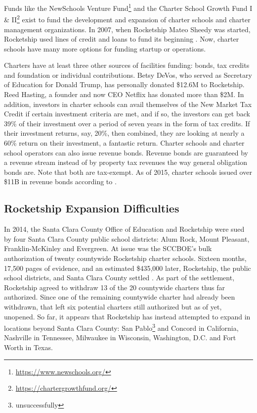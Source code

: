 Funds like the NewSchools Venture Fund\footnote{\url{https://www.newschools.org/}} and the Charter School Growth Fund I \& II\footnote{\url{https://chartergrowthfund.org/}} exist to fund the development and expansion of charter schools and charter management organizations. In 2007, when Rocketship Mateo Sheedy was started, Rocketship used lines of credit and loans to fund its beginning \parencite[260]{Danner2006}. Now, charter schools have many more options for funding startup or operations.

Charters have at least three other sources of facilities funding: bonds, tax credits and foundation or individual contributions. Betsy DeVos, who served as Secretary of Education for Donald Trump, has personally donated \$12.6M to Rocketship. Reed Hasting, a founder and now CEO Netflix has donated more than \$2M. In addition, investors in charter schools can avail themselves of the New Market Tax Credit if certain investment criteria are met, and if so, the investors can get back 39\% of their investment over a period of seven years in the form of tax credits. If their investment returns, say, 20\%, then combined, they are looking at nearly a 60\% return on their investment, a fantastic return. Charter schools and charter school operators can also issue revenue bonds. Revenue bonds are guaranteed by a revenue stream instead of by property tax revenues the way general obligation bonds are. Note that both are tax-exempt. As of 2015, charter schools issued over \$11B in revenue bonds according to \textcite{Clark-Herrera.etal2019}.

\subsection{Rocketship Expansion Difficulties}\label{sec:rocketship-expansion-difficulties}\indent

In 2014, the Santa Clara County Office of Education and Rocketship were sued by four Santa Clara County public school districts: Alum Rock, Mount Pleasant, Franklin-McKinley and Evergreen. At issue was the SCCBOE's bulk authorization of twenty countywide Rocketship charter schools. Sixteen months, 17,500 pages of evidence, and an estimated \$435,000 later, Rocketship, the public school districts, and Santa Clara County settled \parencite{Noguchi2015}. As part of the settlement, Rocketship agreed to withdraw 13 of the 20 countywide charters thus far authorized. Since one of the remaining countywide charter had already been withdrawn, that left six potential charters still authorized but as of yet, unopened. So far, it appears that Rocketship has instead attempted to expand in locations beyond Santa Clara County: San Pablo\footnote{unsuccessfully} and Concord in California, Nashville in Tennessee, Milwaukee in Wisconsin, Washington, D.C. and Fort Worth in Texas.

